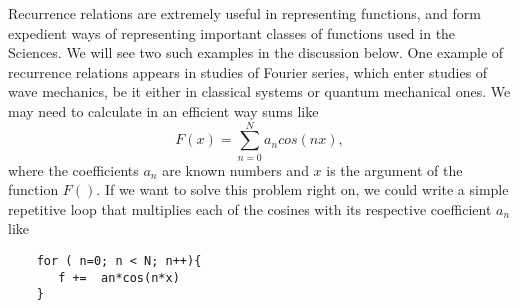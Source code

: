 \begin{prob}
Recurrence relations are
extremely useful in representing functions, and form expedient ways of
representing important classes of functions used in the Sciences. We will
see two such examples in the discussion below.
%
One example of recurrence relations appears in studies
of Fourier series, which enter studies of
wave mechanics, be it either in classical systems or quantum
mechanical ones. We may need to calculate in an efficient 
way sums like
%
\begin{equation}
   F(x)=\sum_{n=0}^{N}a_n cos(nx),
\label{four-1}
\end{equation}
%
where the coefficients $a_n$ are known numbers and $x$ is the argument of
the function $F()$. If we want to solve this problem
right on, we could write a simple repetitive loop that 
multiplies each of the cosines with its respective 
coefficient $a_n$ like
\begin{lstlisting}
    for ( n=0; n < N; n++){
       f +=  an*cos(n*x)
    }
\end{lstlisting}


\end{prob}
